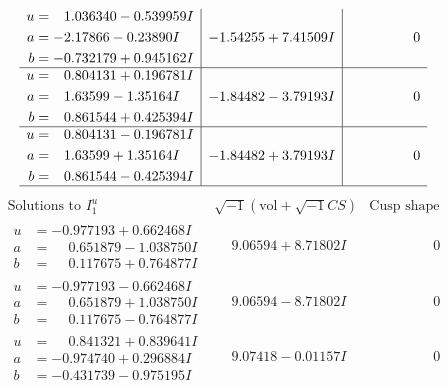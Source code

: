 \documentclass[1p]{elsarticle_modified}
\theoremstyle{definition}
\newcommand{\I}{\sqrt{-1}}
\begin{document}
$$\begin{array}{c|c|c}
\begin{aligned}
u &= \phantom{-}1.036340 - 0.539959 I \\
a &= -2.17866 - 0.23890 I \\
b &= -0.732179 + 0.945162 I\end{aligned}
 & -1.54255 + 7.41509 I & \phantom{-0.000000 } 0 \\ \hline\begin{aligned}
u &= \phantom{-}0.804131 + 0.196781 I \\
a &= \phantom{-}1.63599 - 1.35164 I \\
b &= \phantom{-}0.861544 + 0.425394 I\end{aligned}
 & -1.84482 - 3.79193 I & \phantom{-0.000000 } 0 \\ \hline\begin{aligned}
u &= \phantom{-}0.804131 - 0.196781 I \\
a &= \phantom{-}1.63599 + 1.35164 I \\
b &= \phantom{-}0.861544 - 0.425394 I\end{aligned}
 & -1.84482 + 3.79193 I & \phantom{-0.000000 } 0\\
 \hline 
 \end{array}$$\newpage$$\begin{array}{c|c|c}  
\text{Solutions to }I^u_{1}& \I (\text{vol} + \sqrt{-1}CS) & \text{Cusp shape}\\
 \hline 
\begin{aligned}
u &= -0.977193 + 0.662468 I \\
a &= \phantom{-}0.651879 - 1.038750 I \\
b &= \phantom{-}0.117675 + 0.764877 I\end{aligned}
 & \phantom{-}9.06594 + 8.71802 I & \phantom{-0.000000 } 0 \\ \hline\begin{aligned}
u &= -0.977193 - 0.662468 I \\
a &= \phantom{-}0.651879 + 1.038750 I \\
b &= \phantom{-}0.117675 - 0.764877 I\end{aligned}
 & \phantom{-}9.06594 - 8.71802 I & \phantom{-0.000000 } 0 \\ \hline\begin{aligned}
u &= \phantom{-}0.841321 + 0.839641 I \\
a &= -0.974740 + 0.296884 I \\
b &= -0.431739 - 0.975195 I\end{aligned}
 & \phantom{-}9.07418 - 0.01157 I & \phantom{-0.000000 } 0 \\ \hline\begin{aligned}

\end{aligned}
\end{array}$$
\end{document}
